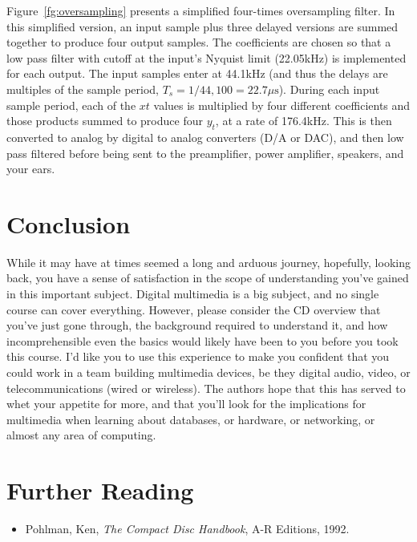 Figure~\ref{fg:oversampling} presents a simplified four-times
oversampling filter. In this simplified version, an input sample plus
three delayed versions are summed together to produce four output
samples. The coefficients are chosen so that a low pass filter with
cutoff at the input's Nyquist limit (22.05kHz) is implemented for each
output. The input samples enter at 44.1kHz (and thus the delays are
multiples of the sample period,
$T_s=1/44,100=22.7\mu\mathrm{s}$). During each input sample period,
each of the $xt$ values is multiplied by four different coefficients
and those products summed to produce four $y_t$, at a rate of
176.4kHz. This is then converted to analog by digital to analog
converters (D/A or DAC), and then low pass filtered before being sent
to the preamplifier, power amplifier, speakers, and your ears.

\section{Conclusion}

While it may have at times seemed a long and arduous journey,
hopefully, looking back, you have a sense of satisfaction in the scope
of understanding you've gained in this important subject.  Digital
multimedia is a big subject, and no single course can cover
everything. However, please consider the CD overview that you've just
gone through, the background required to understand it, and how
incomprehensible even the basics would likely have been to you before
you took this course.  I'd like you to use this experience to make you
confident that you could work in a team building multimedia devices,
be they digital audio, video, or telecommunications (wired or
wireless). The authors hope that this has served to whet your appetite for
more, and that you'll look for the implications for multimedia when
learning about databases, or hardware, or networking, or almost any
area of computing.

\section{Further Reading}

\begin{itemize}
\item Pohlman, Ken, \textit{The Compact Disc Handbook}, A-R Editions,
  1992.
\end{itemize}
